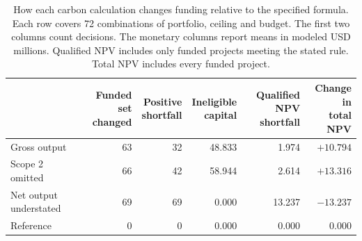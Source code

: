 \ifdefined\readingcopy\begin{table}[!t]\else\begin{table}[!ht]\fi\centering
\caption{How each carbon calculation changes funding relative to the specified formula. Each row covers 72 combinations of portfolio, ceiling and budget. The first two columns count decisions. The monetary columns report means in modeled USD millions. Qualified NPV includes only funded projects meeting the stated rule. Total NPV includes every funded project.}\label{tab:money}
\footnotesize\setlength{\tabcolsep}{4pt}
\begin{tabularx}{\linewidth}{@{}Xrrrrr@{}}\toprule
 & \shortstack[r]{Funded set\\changed} & \shortstack[r]{Positive\\shortfall} & \shortstack[r]{Ineligible\\capital} & \shortstack[r]{Qualified NPV\\shortfall} & \shortstack[r]{Change in\\total NPV}\\\midrule
Gross output & 63 & 32 & 48.833 & 1.974 & $+10.794$\\
Scope 2 omitted & 66 & 42 & 58.944 & 2.614 & $+13.316$\\
Net output understated & 69 & 69 & 0.000 & 13.237 & $-13.237$\\
Reference & 0 & 0 & 0.000 & 0.000 & 0.000\\\bottomrule
\end{tabularx}
\ifdefined\readingcopy\end{table}\else\end{table}\fi
